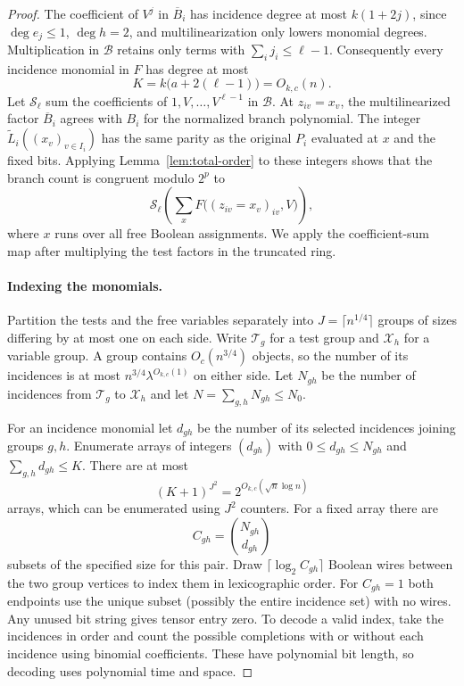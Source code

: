 \begin{proof}
The coefficient of $V^j$ in $\overline B_i$ has incidence degree
at most $k(1+2j)$, since $\deg e_j\le1$, $\deg h=2$, and
multilinearization only lowers monomial degrees. Multiplication in
$\mathcal B$ retains only terms with $\sum_i j_i\le\ell-1$.
Consequently every incidence monomial in $F$ has degree at most
\begin{equation}\label{eq:sharp-incidence-degree}
 K=k\bigl(a+2(\ell-1)\bigr)=O_{k,c}(n).
\end{equation}
Let $\mathcal S_\ell$ sum the coefficients of $1,V,\ldots,V^{\ell-1}$
in $\mathcal B$. At $z_{iv}=x_v$, the multilinearized factor
$\overline B_i$ agrees with $B_i$ for the normalized branch polynomial.
The integer $\widetilde L_i((x_v)_{v\in I_i})$ has the same parity
as the original $P_i$ evaluated at $x$ and the fixed bits. Applying
Lemma~\ref{lem:total-order} to these integers shows that the branch
count is congruent modulo $2^p$ to
\begin{equation}\label{eq:sharp-branch-residue}
 \mathcal S_\ell\left(\sum_x F\bigl((z_{iv}=x_v)_{iv},V\bigr)\right),
\end{equation}
where $x$ runs over all free Boolean assignments. We apply the
coefficient-sum map after multiplying the test factors in the
truncated ring.

\paragraph{Indexing the monomials.}
Partition the tests and the free variables separately into
$J=\lceil n^{1/4}\rceil$ groups of sizes differing by at most one
on each side. Write $\mathcal T_g$ for a test group and
$\mathcal X_h$ for a variable group. A group contains
$O_c(n^{3/4})$ objects, so the number of its incidences is at most
$n^{3/4}\lambda^{O_{k,c}(1)}$ on either side. Let $N_{gh}$ be the
number of incidences from $\mathcal T_g$ to $\mathcal X_h$ and let
$N=\sum_{g,h}N_{gh}\le N_0$.

For an incidence monomial let $d_{gh}$ be the number of its
selected incidences joining groups $g,h$. Enumerate arrays of
integers $(d_{gh})$ with $0\le d_{gh}\le N_{gh}$ and
$\sum_{g,h}d_{gh}\le K$. There are at most
\[
 (K+1)^{J^2}=2^{O_{k,c}(\sqrt n\log n)}
\]
arrays, which can be enumerated using $J^2$ counters. For a fixed
array there are
\[
 C_{gh}=\binom{N_{gh}}{d_{gh}}
\]
subsets of the specified size for this pair. Draw
$\lceil\log_2 C_{gh}\rceil$ Boolean wires between the two group
vertices to index them in lexicographic order. For $C_{gh}=1$
both endpoints use the unique subset (possibly the entire incidence
set) with no wires. Any unused bit string gives tensor entry zero.
To decode a valid index, take the incidences in order and count the
possible completions with or without each incidence using binomial
coefficients. These have polynomial bit length, so decoding uses
polynomial time and space.


\end{proof}
